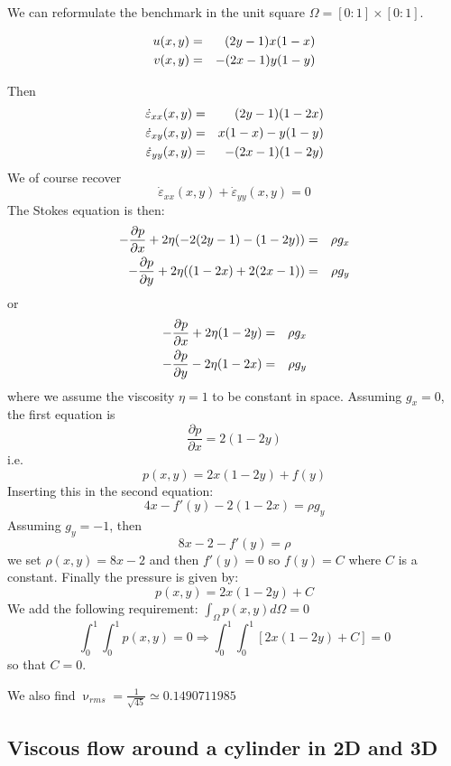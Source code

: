 We can reformulate the benchmark in the unit square $\Omega=[0:1]\times[0:1]$.

\begin{eqnarray}
u(x,y) &=&  (2y-1)x(1-x) \nonumber\\
v(x,y) &=& - (2x-1)y(1-y) \nonumber
\end{eqnarray}

Then 
\begin{eqnarray}
\dot\varepsilon_{xx}(x,y) &=& (2y-1)(1-2x) \nonumber\\
\dot\varepsilon_{xy}(x,y) &=&  x(1-x)  - y(1-y)  \nonumber\\
\dot\varepsilon_{yy}(x,y) &=& - (2x-1)(1-2y)  \nonumber
\end{eqnarray}
We of course recover 
\[
\dot\varepsilon_{xx}(x,y) + \dot\varepsilon_{yy}(x,y) = 0
\]
The Stokes equation is then:
\begin{eqnarray}
-\frac{\partial p}{\partial x} + 2\eta (-2(2y-1)-(1-2y)  ) &=& \rho g_x \nonumber\\
-\frac{\partial p}{\partial y} + 2\eta ((1-2x)+2(2x-1)  ) &=& \rho g_y \nonumber
\end{eqnarray}
or
\begin{eqnarray}
-\frac{\partial p}{\partial x} + 2\eta (1-2y) &=& \rho g_x \nonumber\\
-\frac{\partial p}{\partial y} - 2\eta (1-2x) &=& \rho g_y \nonumber
\end{eqnarray}
where we assume the viscosity $\eta=1$ to be constant in space.
Assuming $g_x=0$, the first equation is
\[
\frac{\partial p}{\partial x} =  2 (1-2y)
\]
i.e.
\[
p(x,y) = 2 x (1-2y) + f(y)
\]
Inserting this in the second equation:
\[
4 x - f'(y) - 2 (1-2x)   = \rho g_y
\]
Assuming $g_y=-1$, then
\[
8 x -2  - f'(y)  = \rho 
\]
we set $\rho(x,y)= 8x-2$ and then $f'(y)=0$ so $f(y)=C$ where $C$
is a constant.
Finally the pressure is given by:
\[
p(x,y)= 2 x (1-2y) + C
\]
We add the following requirement: $\int_\Omega p(x,y) d\Omega =0$ 
\[
\int_{0}^1 \int _0^1 p(x,y) = 0
\Rightarrow 
\int_{0}^1 \int _0^1 [ 2 x (1-2y) + C] = 0
\]
so that $C=0$.

We also find $\upnu_{rms}=\frac{1}{\sqrt{45}}\simeq 0.1490711985$



\subsection{Viscous flow around a cylinder in 2D and 3D } \label{sec:flowcyl}

